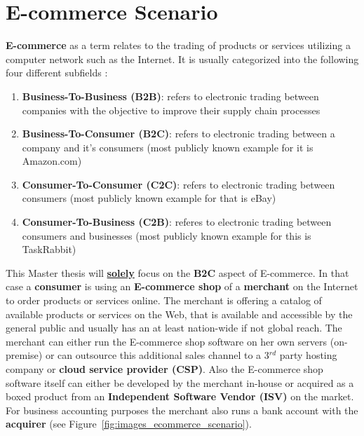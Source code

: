 
\section{E-commerce Scenario}
\label{sec:e_commerce_scenario}

\textbf{E-commerce} as a term relates to the trading of products or services utilizing a computer network such as the Internet. It is usually categorized into the following four different subfields \citep{sen2015study}:\@

\begin{enumerate}
  \item \textbf{Business-To-Business (\gls{B2B})}: refers to electronic trading between companies with the objective to improve their supply chain processes
  \item \textbf{Business-To-Consumer (\gls{B2C})}: refers to electronic trading between a company and it's consumers (most publicly known example for it is Amazon.com)
  \item \textbf{Consumer-To-Consumer (\gls{C2C})}: refers to electronic trading between consumers (most publicly known example for that is eBay)
  \item \textbf{Consumer-To-Business (\gls{C2B})}: referes to electronic trading between consumers and businesses (most publicly known example for this is TaskRabbit)
\end{enumerate}

This Master thesis will \textbf{\underline{solely}} focus on the \textbf{\gls{B2C}} aspect of E-commerce. In that case a \textbf{consumer} is using an \textbf{E-commerce shop} of a \textbf{merchant} on the Internet to order products or services online. The merchant is offering a catalog of available products or services on the Web, that is available and accessible by the general public and usually has an at least nation-wide if not global reach. The merchant can either run the E-commerce shop software on her own servers (on-premise) or can outsource this additional sales channel to a 3$^{rd}$ party hosting company or \textbf{cloud service provider (\gls{CSP})}. Also the E-commerce shop software itself can either be developed by the merchant in-house or acquired as a boxed product from an \textbf{Independent Software Vendor (\gls{ISV})} on the market. For business accounting purposes the merchant also runs a bank account with the \textbf{acquirer} (see Figure~\ref{fig:images_ecommerce_scenario}). \\

